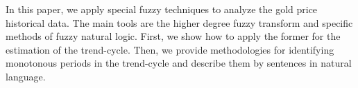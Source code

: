 
		In this paper, we apply special fuzzy techniques to analyze the gold price historical data. The main tools are the higher degree fuzzy transform and specific methods of fuzzy natural logic. First, we show how to apply the former for the estimation of the trend-cycle. Then, we provide methodologies for identifying monotonous periods in the trend-cycle and describe them by sentences in natural language. 
	
